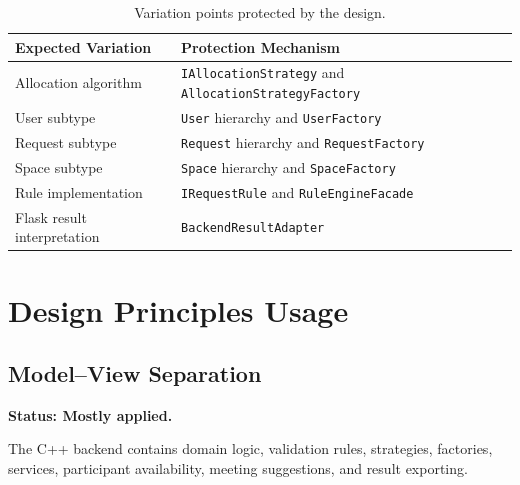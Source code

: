 \documentclass[12pt,a4paper]{article}
\begin{document}
\begin{table}[H]
    \centering
    \small
    \caption{Variation points protected by the design.}
    \begin{tabularx}{\textwidth}{L{4.3cm}Y}
        \toprule
        \textbf{Expected Variation} & \textbf{Protection Mechanism} \\
        \midrule

        Allocation algorithm
        & \texttt{IAllocationStrategy} and
        \texttt{AllocationStrategyFactory} \\

        User subtype
        & \texttt{User} hierarchy and \texttt{UserFactory} \\

        Request subtype
        & \texttt{Request} hierarchy and \texttt{RequestFactory} \\

        Space subtype
        & \texttt{Space} hierarchy and \texttt{SpaceFactory} \\

        Rule implementation
        & \texttt{IRequestRule} and \texttt{RuleEngineFacade} \\

        Flask result interpretation
        & \texttt{BackendResultAdapter} \\

        \bottomrule
    \end{tabularx}
\end{table}

\section{Design Principles Usage}

\subsection{Model--View Separation}

\textbf{Status: Mostly applied.}

The C++ backend contains domain logic, validation rules, strategies, factories,
services, participant availability, meeting suggestions, and result exporting.
\end{document}
